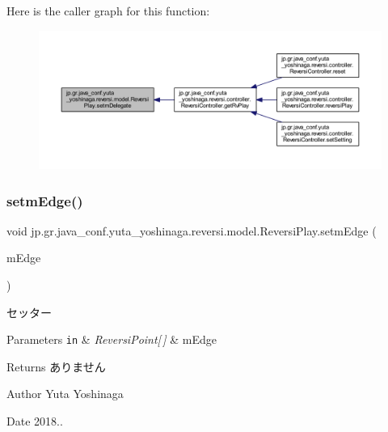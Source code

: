 Here is the caller graph for this function\+:
\nopagebreak
\begin{figure}[H]
\begin{center}
\leavevmode
\includegraphics[width=350pt]{classjp_1_1gr_1_1java__conf_1_1yuta__yoshinaga_1_1reversi_1_1model_1_1_reversi_play_adcfa7bddbb634a7408a9e85fe757bda3_icgraph}
\end{center}
\end{figure}
\mbox{\label{classjp_1_1gr_1_1java__conf_1_1yuta__yoshinaga_1_1reversi_1_1model_1_1_reversi_play_a9433e08f1c4132ad901421e30b98bbfb}} 
\subsubsection{\texorpdfstring{setm\+Edge()}{setmEdge()}}
{\footnotesize\ttfamily void jp.\+gr.\+java\+\_\+conf.\+yuta\+\_\+yoshinaga.\+reversi.\+model.\+Reversi\+Play.\+setm\+Edge (\begin{DoxyParamCaption}\item[{\hyperlink{classjp_1_1gr_1_1java__conf_1_1yuta__yoshinaga_1_1reversi_1_1model_1_1_reversi_point}{Reversi\+Point} \mbox{[}$\,$\mbox{]}}]{m\+Edge }\end{DoxyParamCaption})}



セッター 


\begin{DoxyParams}[1]{Parameters}
\mbox{\tt in}  & {\em Reversi\+Point\mbox{[}$\,$\mbox{]}} & m\+Edge \\
\hline
\end{DoxyParams}
\begin{DoxyReturn}{Returns}
ありません 
\end{DoxyReturn}
\begin{DoxyAuthor}{Author}
Yuta Yoshinaga 
\end{DoxyAuthor}
\begin{DoxyDate}{Date}
2018.. 
\end{DoxyDate}


